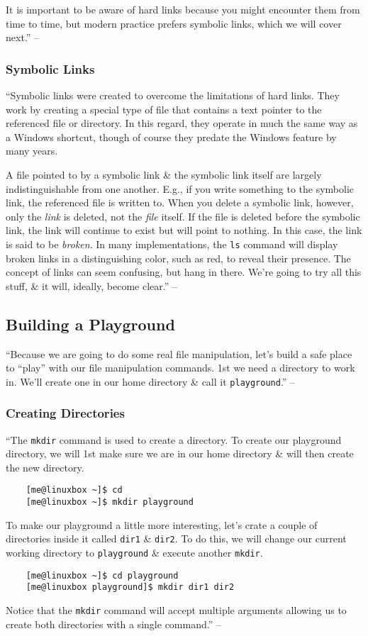\documentclass[oneside]{book}
\numberwithin{equation}{section}
\begin{document}
It is important to be aware of hard links because you might encounter them from time to time, but modern practice prefers symbolic links, which we will cover next.'' -- \cite[pp. 73--74]{Shotts2019}

\subsubsection{Symbolic Links}
``Symbolic links were created to overcome the limitations of hard links. They work by creating a special type of file that contains a text pointer to the referenced file or directory. In this regard, they operate in much the same way as a Windows shortcut, though of course they predate the Windows feature by many years.

A file pointed to by a symbolic link \& the symbolic link itself are largely indistinguishable from one another. E.g., if you write something to the symbolic link, the referenced file is written to. When you delete a symbolic link, however, only the \textit{link} is deleted, not the \textit{file} itself. If the file is deleted before the symbolic link, the link will continue to exist but will point to nothing. In this case, the link is said to be \textit{broken}. In many implementations, the \texttt{ls} command will display broken links in a distinguishing color, such as red, to reveal their presence. The concept of links can seem confusing, but hang in there. We're going to try all this stuff, \& it will, ideally, become clear.'' -- \cite[p. 74]{Shotts2019}

\subsection{Building a Playground}
``Because we are going to do some real file manipulation, let's build a safe place to ``play'' with our file manipulation commands. 1st we need a directory to work in. We'll create one in our home directory \& call it \texttt{playground}.'' -- \cite[p. 75]{Shotts2019}

\subsubsection{Creating Directories}
``The \texttt{mkdir} command is used to create a directory. To create our playground directory, we will 1st make sure we are in our home directory \& will then create the new directory.
\begin{verbatim}
	[me@linuxbox ~]$ cd
	[me@linuxbox ~]$ mkdir playground
\end{verbatim}
To make our playground a little more interesting, let's crate a couple of directories inside it called \texttt{dir1} \& \texttt{dir2}. To do this, we will change our current working directory to \texttt{playground} \& execute another \texttt{mkdir}.
\begin{verbatim}
	[me@linuxbox ~]$ cd playground
	[me@linuxbox playground]$ mkdir dir1 dir2
\end{verbatim}
Notice that the \texttt{mkdir} command will accept multiple arguments allowing us to create both directories with a single command.'' -- \cite[p. 75]{Shotts2019}
\end{document}
